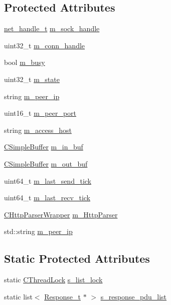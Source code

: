 \subsection*{Protected Attributes}
\begin{DoxyCompactItemize}
\item 
\hyperlink{base_2ostype_8h_a5e1697fa312aa00ac7305460abf166fd}{net\+\_\+handle\+\_\+t} \hyperlink{class_c_http_conn_a4d153604db1c99917afe230fdc74fa32}{m\+\_\+sock\+\_\+handle}
\item 
uint32\+\_\+t \hyperlink{class_c_http_conn_aeaa7109faf07e286701fc2f8d3f580c3}{m\+\_\+conn\+\_\+handle}
\item 
bool \hyperlink{class_c_http_conn_a76b293a06ec3b273f0b5d876e88dac0b}{m\+\_\+busy}
\item 
uint32\+\_\+t \hyperlink{class_c_http_conn_a8305fcc34ba4659d8e2be63abb0316ca}{m\+\_\+state}
\item 
string \hyperlink{class_c_http_conn_af0e7b21f89078b710ec5db50a4780bb0}{m\+\_\+peer\+\_\+ip}
\item 
uint16\+\_\+t \hyperlink{class_c_http_conn_ab4cdd416f3d2971c8c2dc1df7ff77056}{m\+\_\+peer\+\_\+port}
\item 
string \hyperlink{class_c_http_conn_a17d4473dead0652b2f84365c9579344a}{m\+\_\+access\+\_\+host}
\item 
\hyperlink{class_c_simple_buffer}{C\+Simple\+Buffer} \hyperlink{class_c_http_conn_a79f063dfb2647cfd2802802740961009}{m\+\_\+in\+\_\+buf}
\item 
\hyperlink{class_c_simple_buffer}{C\+Simple\+Buffer} \hyperlink{class_c_http_conn_a60dcb5c32e294791754f0ef27ff5ebf9}{m\+\_\+out\+\_\+buf}
\item 
uint64\+\_\+t \hyperlink{class_c_http_conn_aa7e0b04c9d7ddade0caff62f3df26712}{m\+\_\+last\+\_\+send\+\_\+tick}
\item 
uint64\+\_\+t \hyperlink{class_c_http_conn_a0aa0f9c33898a2fe9869f99c8d2680cc}{m\+\_\+last\+\_\+recv\+\_\+tick}
\item 
\hyperlink{class_c_http_parser_wrapper}{C\+Http\+Parser\+Wrapper} \hyperlink{class_c_http_conn_a116ef03e7203ab16e49ccc8385e7b7ca}{m\+\_\+\+Http\+Parser}
\item 
std\+::string \hyperlink{class_c_http_conn_ae7fe9fe05089bf65f266a561f409980a}{m\+\_\+peer\+\_\+ip}
\end{DoxyCompactItemize}
\subsection*{Static Protected Attributes}
\begin{DoxyCompactItemize}
\item 
static \hyperlink{class_c_thread_lock}{C\+Thread\+Lock} \hyperlink{class_c_http_conn_ab23eadafce99e325a29b3f7d4fe42664}{s\+\_\+list\+\_\+lock}
\item 
static list$<$ \hyperlink{struct_response__t}{Response\+\_\+t} $\ast$ $>$ \hyperlink{class_c_http_conn_a120c90e3459db4e7a25f7d2bf491d147}{s\+\_\+response\+\_\+pdu\+\_\+list}
\end{DoxyCompactItemize}


